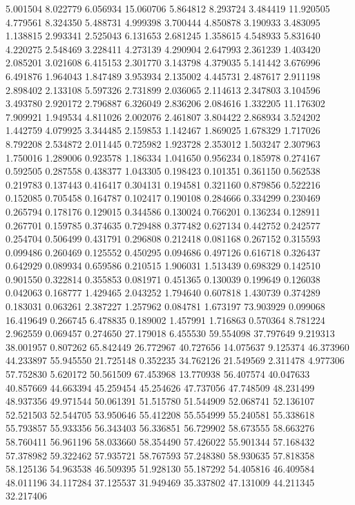 5.001504
8.022779
6.056934
15.060706
5.864812
8.293724
3.484419
11.920505
4.779561
8.324350
5.488731
4.999398
3.700444
4.850878
3.190933
3.483095
1.138815
2.993341
2.525043
6.131653
2.681245
1.358615
4.548933
5.831640
4.220275
2.548469
3.228411
4.273139
4.290904
2.647993
2.361239
1.403420
2.085201
3.021608
6.415153
2.301770
3.143798
4.379035
5.141442
3.676996
6.491876
1.964043
1.847489
3.953934
2.135002
4.445731
2.487617
2.911198
2.898402
2.133108
5.597326
2.731899
2.036065
2.114613
2.347803
3.104596
3.493780
2.920172
2.796887
6.326049
2.836206
2.084616
1.332205
11.176302
7.909921
1.949534
4.811026
2.002076
2.461807
3.804422
2.868934
3.524202
1.442759
4.079925
3.344485
2.159853
1.142467
1.869025
1.678329
1.717026
8.792208
2.534872
2.011445
0.725982
1.923728
2.353012
1.503247
2.307963
1.750016
1.289006
0.923578
1.186334
1.041650
0.956234
0.185978
0.274167
0.592505
0.287558
0.438377
1.043305
0.198423
0.101351
0.361150
0.562538
0.219783
0.137443
0.416417
0.304131
0.194581
0.321160
0.879856
0.522216
0.152085
0.705458
0.164787
0.102417
0.190108
0.284666
0.334299
0.230469
0.265794
0.178176
0.129015
0.344586
0.130024
0.766201
0.136234
0.128911
0.267701
0.159785
0.374635
0.729488
0.377482
0.627134
0.442752
0.242577
0.254704
0.506499
0.431791
0.296808
0.212418
0.081168
0.267152
0.315593
0.099486
0.260469
0.125552
0.450295
0.094686
0.497126
0.616718
0.326437
0.642929
0.089934
0.659586
0.210515
1.906031
1.513439
0.698329
0.142510
0.901550
0.322814
0.355853
0.081971
0.451365
0.130039
0.199649
0.126038
0.042063
0.168777
1.429465
2.043252
1.794640
0.607818
1.430739
0.374289
0.183031
0.063261
2.387227
1.257962
0.084781
1.673197
73.903929
0.099068
16.419649
0.266745
6.478835
0.189002
1.457991
1.716863
0.570364
8.781224
2.962559
0.069457
0.274650
27.179018
6.455530
59.554098
37.797649
9.219313
38.001957
0.807262
65.842449
26.772967
40.727656
14.075637
9.125374
46.373960
44.233897
55.945550
21.725148
0.352235
34.762126
21.549569
2.311478
4.977306
57.752830
5.620172
50.561509
67.453968
13.770938
56.407574
40.047633
40.857669
44.663394
45.259454
45.254626
47.737056
47.748509
48.231499
48.937356
49.971544
50.061391
51.515780
51.544909
52.068741
52.136107
52.521503
52.544705
53.950646
55.412208
55.554999
55.240581
55.338618
55.793857
55.933356
56.343403
56.336851
56.729902
58.673555
58.663276
58.760411
56.961196
58.033660
58.354490
57.426022
55.901344
57.168432
57.378982
59.322462
57.935721
58.767593
57.248380
58.930635
57.818358
58.125136
54.963538
46.509395
51.928130
55.187292
54.405816
46.409584
48.011196
34.117284
37.125537
31.949469
35.337802
47.131009
44.211345
32.217406

